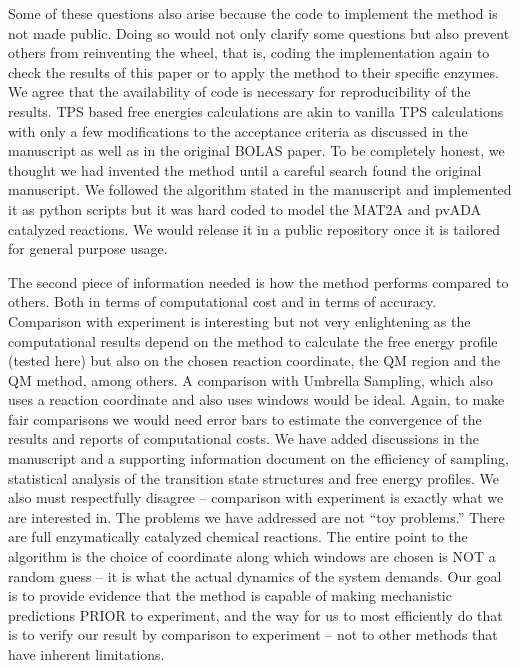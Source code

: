 \documentclass[journal=jpcbfk,manuscript=article,layout=traditional]{achemso}
\begin{document}
{\begin{response}{Some of these questions also arise because the 
code to implement the method is not made public. Doing so would 
not only clarify some questions but also prevent others from 
reinventing the wheel, that is, coding the implementation again 
to check the results of this paper or to apply the method to their specific enzymes.}
We agree that the availability of code is necessary for reproducibility of the results. 
TPS based free energies calculations are akin to vanilla TPS calculations with 
only a few modifications to the acceptance criteria as discussed in the manuscript as well 
as in the original BOLAS paper. To be completely honest, we thought we had invented the 
method until a careful search found the original manuscript. We followed the algorithm 
stated in the manuscript and implemented it as python scripts but it was hard coded 
to model the MAT2A and pvADA catalyzed reactions. We would release it in a public 
repository once it is tailored for general purpose usage.
\end{response}

\begin{response}{The second piece of information needed is how the method 
performs compared to others. Both in terms of computational cost and in 
terms of accuracy. Comparison with experiment is interesting but not very 
enlightening as the computational results depend on the method to calculate 
the free energy profile (tested here) but also on the chosen reaction coordinate, 
the QM region and the QM method, among others. A comparison with Umbrella Sampling, 
which also uses a reaction coordinate and also uses windows would be ideal. Again, 
to make fair comparisons we would need error bars to estimate the convergence of 
the results and reports of computational costs.}
We have added discussions in the manuscript and a supporting information document 
on the efficiency of sampling, statistical analysis of the transition state structures 
and free energy profiles. We also must respectfully disagree – comparison with experiment 
is exactly what we are interested in. The problems we have addressed are not “toy problems.” 
There are full enzymatically catalyzed chemical reactions. The entire point to the 
algorithm is the choice of coordinate along which windows are chosen is NOT a random guess – 
it is what the actual dynamics of the system demands. Our goal is to provide evidence that 
the method is capable of making mechanistic predictions PRIOR to experiment, and the way 
for us to most efficiently do that is to verify our result by comparison to experiment – 
not to other methods that have inherent limitations. 
\end{response}

}
\end{document}
